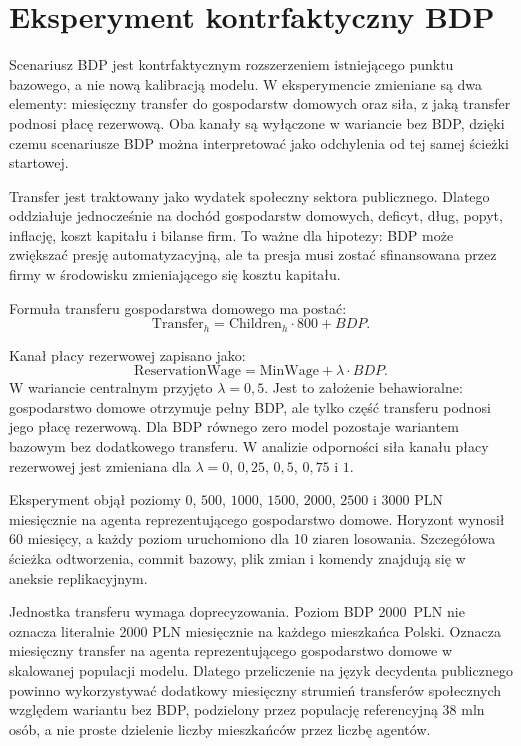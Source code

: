 \section{Eksperyment kontrfaktyczny BDP}

Scenariusz BDP jest kontrfaktycznym rozszerzeniem istniejącego punktu bazowego, a nie nową kalibracją modelu. W eksperymencie zmieniane są dwa elementy: miesięczny transfer do gospodarstw domowych oraz siła, z jaką transfer podnosi płacę rezerwową. Oba kanały są wyłączone w wariancie bez BDP, dzięki czemu scenariusze BDP można interpretować jako odchylenia od tej samej ścieżki startowej.

Transfer jest traktowany jako wydatek społeczny sektora publicznego. Dlatego oddziałuje jednocześnie na dochód gospodarstw domowych, deficyt, dług, popyt, inflację, koszt kapitału i bilanse firm. To ważne dla hipotezy: BDP może zwiększać presję automatyzacyjną, ale ta presja musi zostać sfinansowana przez firmy w środowisku zmieniającego się kosztu kapitału.

Formuła transferu gospodarstwa domowego ma postać:
\begin{equation}
  \mathrm{Transfer}_h = \mathrm{Children}_h \cdot 800 + BDP.
\end{equation}

Kanał płacy rezerwowej zapisano jako:
\begin{equation}
  \mathrm{ReservationWage} = \mathrm{MinWage} + \lambda \cdot BDP.
\end{equation}
W wariancie centralnym przyjęto \(\lambda = 0{,}5\). Jest to założenie behawioralne: gospodarstwo domowe otrzymuje pełny BDP, ale tylko część transferu podnosi jego płacę rezerwową. Dla BDP równego zero model pozostaje wariantem bazowym bez dodatkowego transferu. W analizie odporności siła kanału płacy rezerwowej jest zmieniana dla \(\lambda = 0\), \(0{,}25\), \(0{,}5\), \(0{,}75\) i \(1\).

Eksperyment objął poziomy \(0\), \(500\), \(1000\), \(1500\), \(2000\), \(2500\) i \(3000\) PLN miesięcznie na agenta reprezentującego gospodarstwo domowe. Horyzont wynosił 60 miesięcy, a każdy poziom uruchomiono dla 10 ziaren losowania. Szczegółowa ścieżka odtworzenia, commit bazowy, plik zmian i komendy znajdują się w aneksie replikacyjnym.

Jednostka transferu wymaga doprecyzowania. Poziom BDP 2000~PLN nie oznacza literalnie 2000 PLN miesięcznie na każdego mieszkańca Polski. Oznacza miesięczny transfer na agenta reprezentującego gospodarstwo domowe w skalowanej populacji modelu. Dlatego przeliczenie na język decydenta publicznego powinno wykorzystywać dodatkowy miesięczny strumień transferów społecznych względem wariantu bez BDP, podzielony przez populację referencyjną 38 mln osób, a nie proste dzielenie liczby mieszkańców przez liczbę agentów.

